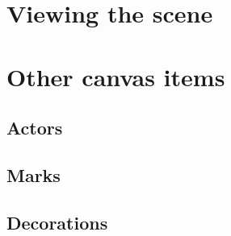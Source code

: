 \section{Viewing the scene}

\section{Other canvas items}


\subsection{Actors}

\subsection{Marks}

\subsection{Decorations}
  


